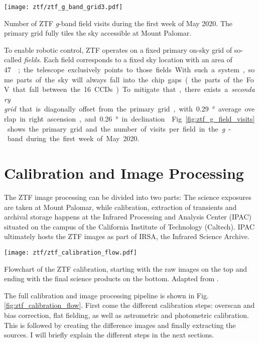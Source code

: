 \begin{marginfigure}
    \texttt{[image: ztf/ztf\_g\_band\_grid3.pdf]}
    \caption[ZTF field visits]{Number of ZTF \textit{g}-band field visits during the first week of May 2020. The primary grid fully tiles the sky accessible at Mount Palomar.}
\end{marginfigure}

To enable robotic control, ZTF operates on a fixed primary on-sky grid of so-called \textit{fields}. Each field corresponds to a fixed sky location with an area of \SI{47}{\square\deg}; the telescope exclusively points to those fields. With such a system, some parts of the sky will always fall into the chip gaps (the parts of the FoV that fall between the 16 CCDs). To mitigate that, there exists a \textit{secondary grid} that is diagonally offset from the primary grid, with \SI{0.29}{\degree} average overlap in right ascension, and \SI{0.26}{\degree} in declination . Fig. \ref{fig:ztf_g_field_visits} shows the primary grid and the number of visits per field in the \textit{g}-band during the first week of May 2020.

\section{Calibration and Image Processing}
The ZTF image processing can be divided into two parts: The science exposures are taken at Mount Palomar, while calibration, extraction of transients and archival storage happens at the Infrared Processing and Analysis Center (IPAC) situated on the campus of the California Institute of Technology (Caltech). IPAC ultimately hosts the ZTF images as part of IRSA, the Infrared Science Archive.

\begin{marginfigure}
    \texttt{[image: ztf/ztf\_calibration\_flow.pdf]}
    \caption[ZTF realtime flowchart]{Flowchart of the ZTF calibration, starting with the raw images on the top and ending with the final science products on the bottom. Adapted from \cite{Laher2018}.}
\end{marginfigure}

The full calibration and image processing pipeline is shown in Fig. \ref{fig:ztf_calibration_flow}. First come the different calibration steps: overscan and bias correction, flat fielding, as well as astrometric and photometric calibration. This is followed by creating the difference images and finally extracting the sources. I will briefly explain the different steps in the next sections.

